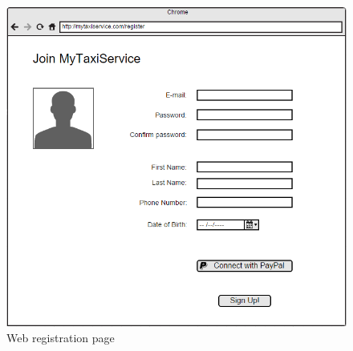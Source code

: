 \documentclass{article}
\begin{document}
\begin{figure}[h!]
    \centering
    \includegraphics[width=0.5\columnwidth]{Register/Register}
    \caption{Web registration page}
    \label{fig:web-register}
\end{figure}

\newpage
\end{document}
